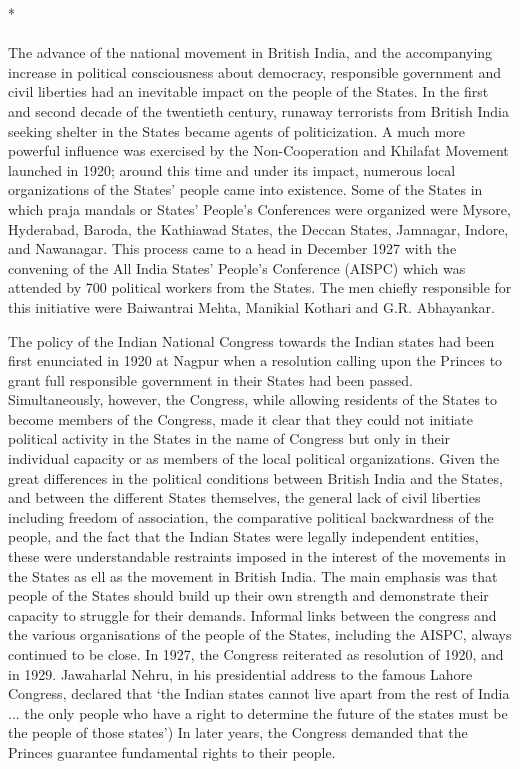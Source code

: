 \begin{multicols}{2}
\begin{center}*\end{center}

\paragraph*{}

The advance of the national movement in British India, and the accompanying increase in political consciousness about democracy, responsible government and civil liberties had an inevitable impact on the people of the States. In the first and second decade of the twentieth century, runaway terrorists from British India seeking shelter in the States became agents of politicization. A much more powerful influence was exercised by the Non-Cooperation and Khilafat Movement launched in 1920; around this time and under its impact, numerous local organizations of the States' people came into existence. Some of the States in which praja mandals or States' People's Conferences were organized were Mysore, Hyderabad, Baroda, the Kathiawad States, the Deccan States, Jamnagar, Indore, and Nawanagar. This process came to a head in December 1927 with the convening of the All India States' People's Conference (AISPC) which was attended by 700 political workers from the States. The men chiefly responsible for this initiative were Baiwantrai Mehta, Manikial Kothari and G.R. Abhayankar. 

The policy of the Indian National Congress towards the Indian states had been first enunciated in 1920 at Nagpur when a resolution calling upon the Princes to grant full responsible government in their States had been passed. Simultaneously, however, the Congress, while allowing residents of the States to become members of the Congress, made it clear that they could not initiate political activity in the States in the name of Congress but only in their individual capacity or as members of the local political organizations. Given the great differences in the political conditions between British India and the States, and between the different States themselves, the general lack of civil liberties including freedom of association, the comparative political backwardness of the people, and the fact that the Indian States were legally independent entities, these were understandable restraints imposed in the interest of the movements in the States as ell as the movement in British India. The main emphasis was that people of the States should build up their own strength and demonstrate their capacity to struggle for their demands. Informal links between the congress and the various organisations of the people of the States, including the AISPC, always continued to be close. In 1927, the Congress reiterated as resolution of 1920, and in 1929. Jawaharlal Nehru, in his presidential address to the famous Lahore Congress, declared that `the Indian states cannot live apart from the rest of India ... the only people who have a right to determine the future of the states must be the people of those states') In later years, the Congress demanded that the Princes guarantee fundamental rights to their people. 


\end{multicols}
